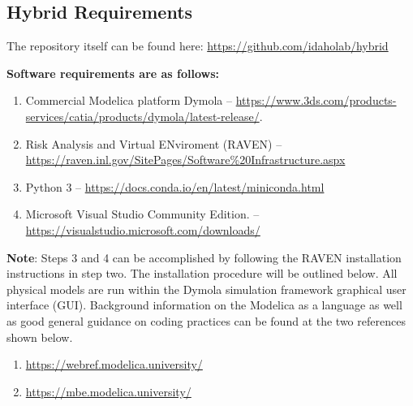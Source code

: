 \subsection{Hybrid Requirements}


The repository itself can be found here: \url{https://github.com/idaholab/hybrid}
 
\textbf{Software requirements are as follows:}

\begin{enumerate}
\item Commercial Modelica platform Dymola -- \url{https://www.3ds.com/products-services/catia/products/dymola/latest-release/}.
\item Risk Analysis and Virtual ENviroment (RAVEN) -- \url{https://raven.inl.gov/SitePages/Software%20Infrastructure.aspx}
\item Python 3 -- \url{https://docs.conda.io/en/latest/miniconda.html}
\item Microsoft Visual Studio Community Edition. -- \url{https://visualstudio.microsoft.com/downloads/}
\end{enumerate}

	

\textbf{Note}: Steps 3 and 4 can be accomplished by following the RAVEN installation instructions in step two. The installation procedure will be outlined below. 
All physical models are run within the Dymola simulation framework graphical user interface (GUI).  Background information on the Modelica as a language as well as good general guidance on coding practices can be found at the two references shown below. 
\begin{enumerate}
\item \url{https://webref.modelica.university/}
\item \url{https://mbe.modelica.university/}
\end{enumerate}